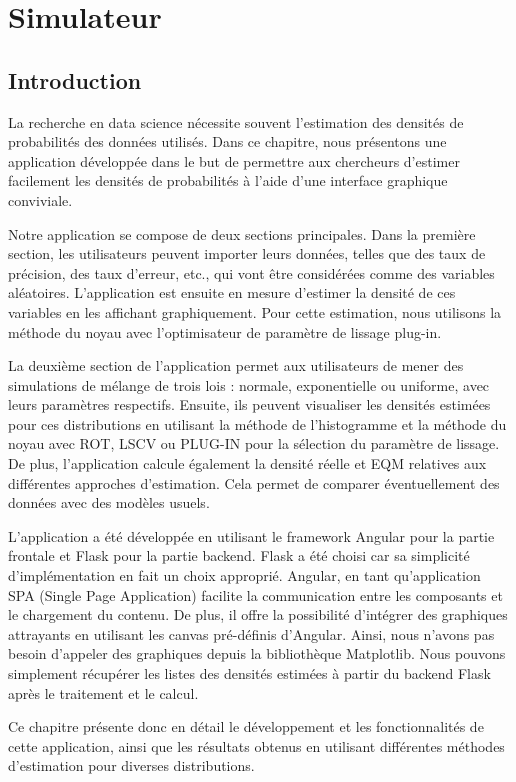\chapter{Simulateur}
\section{Introduction}
La recherche en data science nécessite souvent l'estimation des densités de probabilités des données utilisés. Dans ce chapitre, nous présentons une application développée dans le but de permettre aux chercheurs d'estimer facilement les densités de probabilités à l'aide d'une interface graphique conviviale.

Notre application se compose de deux sections principales. Dans la première section, les utilisateurs peuvent importer leurs données, telles que des taux de précision, des taux d'erreur, etc., qui vont être considérées comme des variables aléatoires. L'application est ensuite en mesure d'estimer la densité de ces variables en les affichant graphiquement. Pour cette estimation, nous utilisons la méthode du noyau avec l'optimisateur de paramètre de lissage plug-in.

La deuxième section de l'application permet aux utilisateurs de mener des simulations de mélange de trois lois : normale, exponentielle ou uniforme, avec leurs paramètres respectifs. Ensuite, ils peuvent visualiser les densités estimées pour ces distributions en utilisant la méthode de l’histogramme et la méthode du noyau avec ROT, LSCV ou PLUG-IN pour la sélection du paramètre de lissage. De plus, l'application calcule également la densité réelle et EQM relatives aux différentes approches d'estimation. Cela permet de comparer éventuellement des données avec des modèles usuels.

L'application a été développée en utilisant le framework Angular pour la partie frontale et Flask pour la partie backend. Flask a été choisi car sa simplicité d'implémentation en fait un choix approprié. Angular, en tant qu'application SPA (Single Page Application) facilite la communication entre les composants et le chargement du contenu. De plus, il offre la possibilité d'intégrer des graphiques attrayants en utilisant les canvas pré-définis d'Angular. Ainsi, nous n'avons pas besoin d'appeler des graphiques depuis la bibliothèque Matplotlib. Nous pouvons simplement récupérer les listes des densités estimées à partir du backend Flask après le traitement et le calcul.

Ce chapitre présente donc en détail le développement et les fonctionnalités de cette application, ainsi que les résultats obtenus en utilisant différentes méthodes d'estimation pour diverses distributions.

